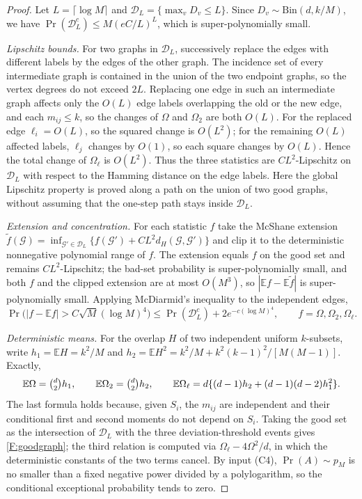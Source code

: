 \documentclass[a4paper,11pt]{article}
\numberwithin{equation}{section}
\newcommand{\E}{\mathbb E}
\begin{document}
\begin{proof}
Let $L=\lceil\log M\rceil$ and $\mathcal D_L=\{\max_vD_v\le L\}$. Since $D_v\sim\mathrm{Bin}(d,k/M)$, we have
$\Pr(\mathcal D_L^c)\le M(eC/L)^L$, which is super-polynomially small.

\emph{Lipschitz bounds.} For two graphs in $\mathcal D_L$, successively replace the edges with different labels
by the edges of the other graph. The incidence set of every intermediate graph is contained in the union of
the two endpoint graphs, so the vertex degrees do not exceed $2L$. Replacing one edge in such an intermediate
graph affects only the $O(L)$ edge labels overlapping the old or the new edge, and each $m_{ij}\le k$, so the
changes of $\Omega$ and $\Omega_2$ are both $O(L)$. For the replaced edge $\ell_i=O(L)$, so the squared change
is $O(L^2)$; for the remaining $O(L)$ affected labels, $\ell_j$ changes by $O(1)$, so each square changes by
$O(L)$. Hence the total change of $\Omega_\ell$ is $O(L^2)$. Thus the three statistics are $CL^2$-Lipschitz on
$\mathcal D_L$ with respect to the Hamming distance on the edge labels. Here the global Lipschitz property is
proved along a path on the union of two good graphs, without assuming that the one-step path stays inside
$\mathcal D_L$.

\emph{Extension and concentration.} For each statistic $f$ take the McShane extension
$\widetilde f(\mathcal G)=\inf_{\mathcal G'\in\mathcal D_L}\{f(\mathcal G')+CL^2d_H(\mathcal G,\mathcal G')\}$
and clip it to the deterministic nonnegative polynomial range of $f$. The extension equals $f$ on the good set
and remains $CL^2$-Lipschitz; the bad-set probability is super-polynomially small, and both $f$ and the clipped
extension are at most $O(M^3)$, so $|\E f-\E\widetilde f|$ is super-polynomially small. Applying McDiarmid's
inequality to the independent edges,
\[
\Pr\bigl(|f-\E f|>C\sqrt M(\log M)^4\bigr)\le\Pr(\mathcal D_L^c)+2e^{-c(\log M)^4},\qquad f=\Omega,\Omega_2,\Omega_\ell.
\]

\emph{Deterministic means.} For the overlap $H$ of two independent uniform $k$-subsets, write
$h_1=\E H=k^2/M$ and $h_2=\E H^2=k^2/M+k^2(k-1)^2/[M(M-1)]$. Exactly,
\[
\E\Omega=\tbinom d2h_1,\qquad\E\Omega_2=\tbinom d2h_2,\qquad\E\Omega_\ell=d\{(d-1)h_2+(d-1)(d-2)h_1^2\}.
\]
The last formula holds because, given $S_i$, the $m_{ij}$ are independent and their conditional first and
second moments do not depend on $S_i$. Taking the good set as the intersection of $\mathcal D_L$ with the three
deviation-threshold events gives \eqref{F:goodgraph}; the third relation is computed via
$\Omega_\ell-4\Omega^2/d$, in which the deterministic constants of the two terms cancel. By input (C4),
$\Pr(A)\sim p_M$ is no smaller than a fixed negative power divided by a polylogarithm, so the conditional
exceptional probability tends to zero.
\end{proof}
\end{document}
